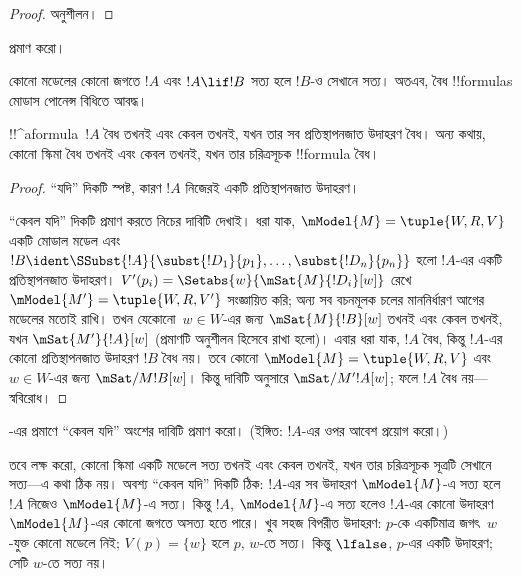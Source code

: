 \documentclass[../../../include/open-logic-section]{subfiles}
\begin{document}
\begin{proof}
  অনুশীলন।
\end{proof}

\begin{prob}
   প্রমাণ করো।
\end{prob}

\begin{prop}
  কোনো মডেলের কোনো জগতে $!A$ এবং $!A \lif !B$ সত্য হলে $!B$-ও
  সেখানে সত্য। অতএব, বৈধ !!{formula}s মোডাস পোনেন্স বিধিতে আবদ্ধ।
\end{prop}

\begin{prop}
  !!^a{formula}~$!A$ বৈধ তখনই এবং কেবল তখনই, যখন তার সব
  প্রতিস্থাপনজাত উদাহরণ বৈধ। অন্য কথায়, কোনো স্কিমা বৈধ তখনই এবং
  কেবল তখনই, যখন তার চরিত্রসূচক !!{formula} বৈধ।
\end{prop}

\begin{proof}
  ``যদি'' দিকটি স্পষ্ট, কারণ $!A$ নিজেরই একটি প্রতিস্থাপনজাত উদাহরণ।

  ``কেবল যদি'' দিকটি প্রমাণ করতে নিচের দাবিটি দেখাই। ধরা যাক,
  $\mModel{M} = \tuple{W, R, V}$ একটি মোডাল মডেল এবং $!B \ident
  \SSubst{!A}{\subst{!D_1}{p_1},\dots,\subst{!D_n}{p_n}}$ হলো
  $!A$-এর একটি প্রতিস্থাপনজাত উদাহরণ। $V'(p_i) =
  \Setabs{w}{\mSat{M}{!D_i}[w]}$ রেখে $\mModel{M'} = \tuple{W, R,
    V'}$ সংজ্ঞায়িত করি; অন্য সব বচনমূলক চলের মাননির্ধারণ আগের মডেলের
  মতোই রাখি। তখন যেকোনো~$w \in W$-এর জন্য
  $\mSat{M}{!B}[w]$ তখনই এবং কেবল তখনই, যখন $\mSat{M'}{!A}[w]$
  (প্রমাণটি অনুশীলন হিসেবে রাখা হলো)। এবার ধরা যাক, $!A$ বৈধ,
  কিন্তু $!A$-এর কোনো প্রতিস্থাপনজাত উদাহরণ $!B$ বৈধ নয়। তবে কোনো
  $\mModel{M} = \tuple{W, R, V}$ এবং $w \in W$-এর জন্য
  $\mSat/{M}{!B}[w]$। কিন্তু দাবিটি অনুসারে
  $\mSat/{M'}{!A}[w]$; ফলে $!A$ বৈধ নয়—স্ববিরোধ।
\end{proof}

\begin{prob}
  -এর প্রমাণে ``কেবল যদি''
  অংশের দাবিটি প্রমাণ করো। (ইঙ্গিত: $!A$-এর ওপর আবেশ প্রয়োগ করো।)
\end{prob}

তবে লক্ষ করো, কোনো স্কিমা একটি মডেলে সত্য তখনই এবং কেবল তখনই, যখন
তার চরিত্রসূচক সূত্রটি সেখানে সত্য—এ কথা ঠিক নয়। অবশ্য ``কেবল যদি''
দিকটি ঠিক: $!A$-এর সব উদাহরণ $\mModel{M}$-এ সত্য হলে
$!A$ নিজেও $\mModel{M}$-এ সত্য। কিন্তু $!A$, $\mModel{M}$-এ সত্য
হলেও $!A$-এর কোনো উদাহরণ $\mModel{M}$-এর কোনো জগতে অসত্য হতে পারে।
খুব সহজ বিপরীত উদাহরণ: $p$-কে একটিমাত্র জগৎ~$w$-যুক্ত কোনো মডেলে নিই;
$V(p) = \{w\}$
হলে $p$, $w$-তে সত্য। কিন্তু $\lfalse$, $p$-এর একটি উদাহরণ;
সেটি $w$-তে সত্য নয়।
\end{document}
